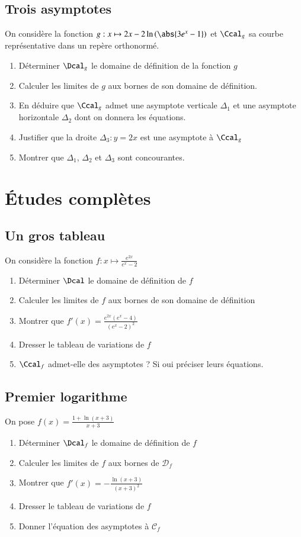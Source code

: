\documentclass[oneside,12pt]{article}          %
\begin{document}
\subsection{Trois asymptotes}
On considère la fonction $g:x\mapsto 2x-2\ln\left(\abs{3e^x-1}\right)$ et $\Ccal_g$ sa courbe représentative dans un repère orthonormé.
\begin{enumerate}
	\item Déterminer $\Dcal_g$ le domaine de définition de la fonction $g$
	\item Calculer les limites de $g$ aux bornes de son domaine de définition.
	\item En déduire que $\Ccal_g$ admet une asymptote verticale $\Delta_1$ et une asymptote horizontale $\Delta_2$ dont on donnera les équations.
	\item Justifier que la droite $\Delta_3:y=2x$ est une asymptote à $\Ccal_g$
	\item Montrer que $\Delta_1$, $\Delta_2$ et $\Delta_3$ sont concourantes.
\end{enumerate}



\section{Études complètes}

\subsection{Un gros tableau}
On considère la fonction $f:x\mapsto \frac{e^{2x}}{e^x-2}$
\begin{enumerate}
	\item Déterminer $\Dcal$ le domaine de définition de $f$
	\item Calculer les limites de $f$ aux bornes de son domaine de définition
	\item Montrer que $f'(x)=\frac{e^{2x}(e^x-4)}{(e^x-2)^2}$
	\item Dresser le tableau de variations de $f$
	\item $\Ccal_f$ admet-elle des asymptotes ? Si  oui préciser leurs équations.
\end{enumerate}



\subsection{Premier logarithme}
On pose $f(x) = \frac{1 + \ln(x+3)}{x+3}$
\begin{enumerate}
    \item Déterminer $\Dcal_f$ le domaine de définition de $f$
    \item Calculer les limites de $f$ aux bornes de $\mathcal{D}_f$
    \item Montrer que $f'(x)=-\frac{\ln(x+3)}{(x+3)^2}$
    \item Dresser le tableau de variations de $f$
    \item Donner l'équation des asymptotes à $\mathcal{C}_f$
\end{enumerate}
\end{document}
